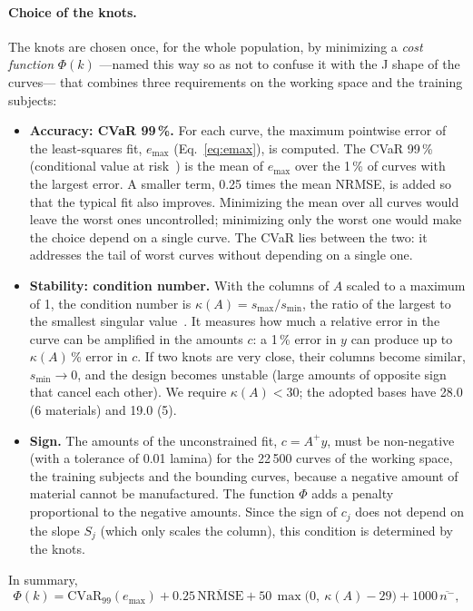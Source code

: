 \paragraph{Choice of the knots.} The knots are chosen once, for the whole population, by minimizing a \emph{cost function} $\Phi(k)$ ---named this way so as not to confuse it with the J shape of the curves--- that combines three requirements on the working space and the training subjects:
\begin{itemize}
\item \textbf{Accuracy: CVaR 99\,\%.} For each curve, the maximum pointwise error of the least-squares fit, $e_{\max}$ (Eq.~\ref{eq:emax}), is computed. The CVaR 99\,\% (conditional value at risk~\cite{rockafellar}) is the mean of $e_{\max}$ over the 1\,\% of curves with the largest error. A smaller term, 0.25 times the mean NRMSE, is added so that the typical fit also improves. Minimizing the mean over all curves would leave the worst ones uncontrolled; minimizing only the worst one would make the choice depend on a single curve. The CVaR lies between the two: it addresses the tail of worst curves without depending on a single one.
\item \textbf{Stability: condition number.} With the columns of $A$ scaled to a maximum of 1, the condition number is $\kappa(A)=s_{\max}/s_{\min}$, the ratio of the largest to the smallest singular value~\cite{trefethen}. It measures how much a relative error in the curve can be amplified in the amounts $c$: a 1\,\% error in $y$ can produce up to $\kappa(A)$\,\% error in $c$. If two knots are very close, their columns become similar, $s_{\min}\to0$, and the design becomes unstable (large amounts of opposite sign that cancel each other). We require $\kappa(A)<30$; the adopted bases have 28.0 (6 materials) and 19.0 (5).
\item \textbf{Sign.} The amounts of the unconstrained fit, $c=A^+y$, must be non-negative (with a tolerance of 0.01 lamina) for the 22\,500 curves of the working space, the training subjects and the bounding curves, because a negative amount of material cannot be manufactured. The function $\Phi$ adds a penalty proportional to the negative amounts. Since the sign of $c_j$ does not depend on the slope $S_j$ (which only scales the column), this condition is determined by the knots.
\end{itemize}
In summary,
\begin{equation}\label{eq:costo}
\Phi(k)=\mathrm{CVaR}_{99}(e_{\max})+0.25\,\overline{\mathrm{NRMSE}}+50\,\max\bigl(0,\ \kappa(A)-29\bigr)+1000\,\overline{n^{-}},
\end{equation}
